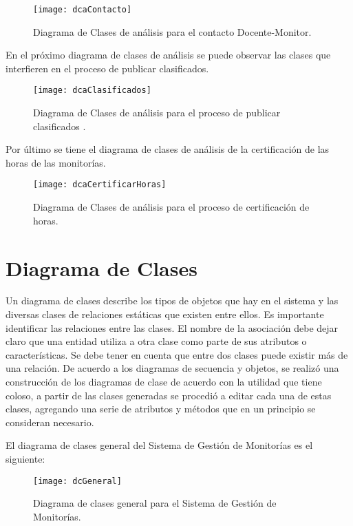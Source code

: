 \begin{figure}[H]
	\centering
	\texttt{[image: dcaContacto]}
	\centering
	\caption{Diagrama de Clases de análisis para el contacto Docente-Monitor.}
	\label{fig:dcaContacto}
\end{figure}

En el próximo diagrama de clases de análisis se puede observar las clases que interfieren en el proceso de publicar clasificados.

\begin{figure}[H]
	\centering
	\texttt{[image: dcaClasificados]}
	\centering
	\caption{Diagrama de Clases de análisis para el proceso de publicar clasificados .}
	\label{fig:dcaClasificado}
\end{figure}
\clearpage
Por último se tiene el diagrama de clases de análisis de la certificación de las horas de las monitorías.

\begin{figure}[H]
	\centering
	\texttt{[image: dcaCertificarHoras]}
	\centering
	\caption{Diagrama de Clases de análisis para el proceso de certificación de horas.}
	\label{fig:dcaCertificarHoras}
\end{figure}

\newpage

\section{Diagrama de Clases}

Un diagrama de clases describe los tipos de objetos que hay en el sistema y las diversas clases de relaciones estáticas que existen entre ellos.
Es importante identificar las relaciones entre las clases. El nombre de la asociación debe dejar claro que una entidad utiliza a otra clase como parte de sus atributos o características. Se debe tener en cuenta que entre dos clases puede existir más de una relación.\cite{Sergio_2015}
\newline
De acuerdo a los diagramas de secuencia y objetos, se realizó una construcción de los diagramas de clase de acuerdo con la utilidad que tiene coloso, a partir de las clases generadas se procedió a editar cada una de estas clases, agregando una serie de atributos y métodos que en un principio se consideran necesario.

El diagrama de clases general del Sistema de Gestión de Monitorías es el siguiente:

\begin{figure}[H]
	\centering
	\texttt{[image: dcGeneral]}
	\centering
	\caption{Diagrama de clases general para el Sistema de Gestión de Monitorías.}
	\label{fig:dcGeneral}
\end{figure}



